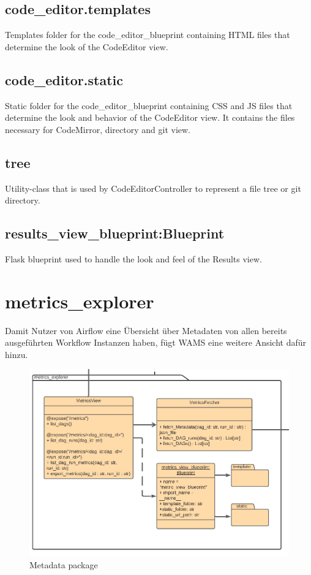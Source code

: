 \subsection{code\_editor.templates}
Templates folder for the code\_editor\_blueprint containing HTML files that determine the look of the CodeEditor view.

\subsection{code\_editor.static}
Static folder for the code\_editor\_blueprint containing CSS and JS files that determine the look and 
behavior of the CodeEditor view. It contains the files necessary for CodeMirror, directory and git view.

\subsection{tree}
Utility-class that is used by CodeEditorController to represent a file tree or git directory.


\subsection{results\_view\_blueprint:Blueprint}
Flask blueprint used to handle the look and feel of the Results view.


\section{metrics\_explorer}
Damit Nutzer von Airflow eine Übersicht über Metadaten von allen bereits ausgeführten Workflow Instanzen haben, fügt WAMS eine weitere Ansicht dafür hinzu.

 \begin{figure} [ht]
    \centering
    \includegraphics[width=\textwidth]{Diagramme/KlassendiagrammAusschnitte/Klassendiagramm -metadata explorer.png}
    \caption{Metadata package}
    \label{fig:metadata section}
\end{figure}


